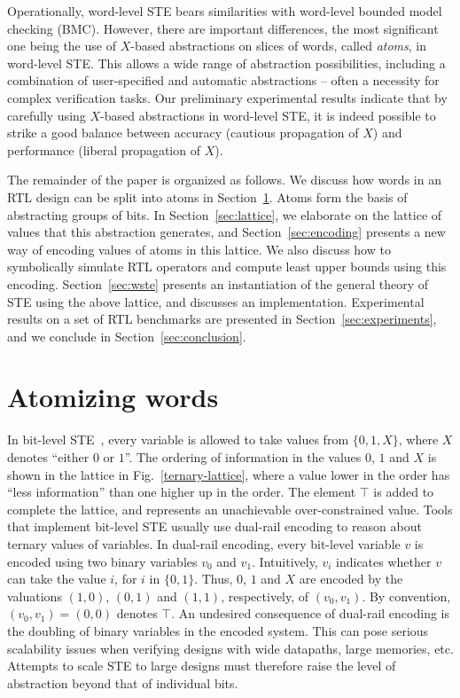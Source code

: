 \documentclass{llncs}
\begin{document}
Operationally, word-level STE bears similarities with word-level
bounded model checking (BMC).  However, there are important
differences, the most significant one being the use of $X$-based
abstractions on slices of words, called \emph{atoms}, in word-level
STE.  This allows a wide range of abstraction possibilities, including
a combination of user-specified and automatic abstractions -- often a
necessity for complex verification tasks.  Our preliminary
experimental results indicate that by carefully using $X$-based
abstractions in word-level STE, it is indeed possible to strike a good
balance between accuracy (cautious propagation of $X$) and performance
(liberal propagation of $X$).

The remainder of the paper is organized as follows.  We discuss how
words in an RTL design can be split into atoms in
Section~\ref{sec:atomization}.  Atoms form the basis of abstracting
groups of bits.  In Section~\ref{sec:lattice}, we elaborate on the
lattice of values that this abstraction generates, and
Section~\ref{sec:encoding} presents a new way of encoding values of
atoms in this lattice.  We also discuss how to symbolically simulate
RTL operators and compute least upper bounds using this encoding.
Section~\ref{sec:wste} presents an instantiation of the general theory
of STE using the above lattice, and discusses an implementation.
Experimental results on a set of RTL benchmarks are presented in
Section~\ref{sec:experiments}, and we conclude in
Section~\ref{sec:conclusion}.

\section{Atomizing words}\label{sec:atomization}
In bit-level STE~\cite{BryantSeger90,SegerJOMABS05}, every variable is
allowed to take values from $\{0, 1, X\}$, where $X$ denotes ``either
$0$ or $1$''.  The ordering of information in the values $0$, $1$ and
$X$ is shown in the lattice in Fig.~\ref{ternary-lattice}, where a
value lower in the order has ``less information'' than one higher up
in the order.  The element $\top$ is added to complete the lattice,
and represents an unachievable over-constrained value.  Tools that
implement bit-level STE usually use dual-rail encoding to reason about
ternary values of variables.  In dual-rail encoding, every bit-level
variable $v$ is encoded using two binary variables $v_0$ and $v_1$.
Intuitively, $v_i$ indicates whether $v$ can take the value $i$, for
$i$ in $\{0, 1\}$.  Thus, $0$, $1$ and $X$ are encoded by the
valuations $(1, 0)$, $(0, 1)$ and $(1, 1)$, respectively, of $(v_0,
v_1)$.  By convention, $(v_0, v_1) = (0, 0)$ denotes $\top$.  An
undesired consequence of dual-rail encoding is the doubling of binary
variables in the encoded system.  This can pose serious scalability
issues when verifying designs with wide datapaths, large memories,
etc.  Attempts to scale STE to large designs must therefore raise the
level of abstraction beyond that of individual bits.
\end{document}
